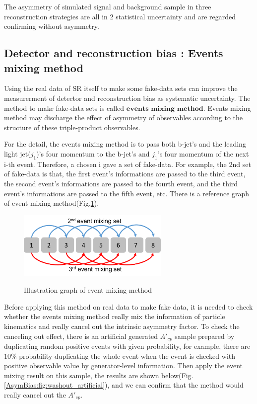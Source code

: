 		The asymmetry of simulated signal and background sample in three reconstruction strategies are all in 2 statistical uncertainty and are regarded confirming without asymmetry.

	\subsection{Detector and reconstruction bias : Events mixing method}
	\label{ssec:evts_mixing}

		Using the real data of SR itself to make some fake-data sets can improve the measurerment of detector and reconstruction bias as systematic uncertainty. The method to make fake-data sets is called $\textbf{events mixing method}$. Events mixing method may discharge the effect of asymmetry of observables according to the structure of these triple-product observables.

		For the detail, the events mixing method is to pass both b-jet's and the leading light jet($j_1$)'s four momentum to the b-jet's and $j_1$'s four momentum of the next i-th event. Therefore, a chosen i gave a set of fake-data. For example, the 2nd set of fake-data is that, the first event's informations are passed to the third event, the second event's informations are passed to the fourth event, and the third event's informations are passed to the fifth event, etc. There is a reference graph of event mixing method(Fig.\ref{AsymBias:fig:event_mixing}).

		\begin{figure}[H]
		\centering{}
	    	\includegraphics[width=0.65\textwidth]{Figures/Asym/event_mixing.pdf}\\
		\caption{Illustration graph of event mixing method}
		\label{AsymBias:fig:event_mixing}
		\end{figure}
		\FloatBarrier

		Before applying this method on real data to make fake data, it is needed to check whether the events mixing method really mix the information of particle kinematics and really cancel out the intrinsic asymmetry factor. To check the canceling out effect, there is an artificial generated $A'_{cp}$ sample prepared by duplicating random positive events with given probability, for example, there are $10\%$ probability duplicating the whole event when the event is checked with positive observable value by generator-level information. Then apply the event mixing result on this sample, the results are shown below(Fig.\ref{AsymBias:fig:washout_artificial}), and we can confirm that the method would really cancel out the $A'_{cp}$.

